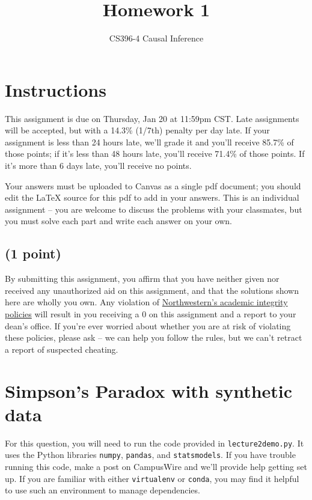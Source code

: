\documentclass[12pt]{article}
\title{Homework 1}
\author{CS396-4 Causal Inference}
\begin{document}
\maketitle

\section*{Instructions}

This assignment is due on Thursday, Jan 20 at 11:59pm CST. Late assignments will be accepted, but with a 14.3\% (1/7th) penalty per day late. If your assignment is less than 24 hours late, we’ll grade it and you’ll receive 85.7\% of those points; if it’s less than 48 hours late, you’ll receive 71.4\% of those points. If it’s more than 6 days late, you’ll receive no points.

Your answers must be uploaded to Canvas as a single pdf document; you should edit the LaTeX source for this pdf to add in your answers. This is an individual assignment -- you are welcome to discuss the problems with your classmates, but you must solve each part and write each answer on your own.

\subsection{(1 point)}

By submitting this assignment, you affirm that you have neither given nor received any unauthorized aid on this assignment, and that the solutions shown here are wholly you own. Any violation of \href{https://www.northwestern.edu/provost/policies/academic-integrity/index.html}{Northwestern's academic integrity policies} will result in you receiving a 0 on this assignment and a report to your dean's office. If you're ever worried about whether you are at risk of violating these policies, please ask -- we can help you follow the rules, but we can't retract a report of suspected cheating.

\clearpage

\section{Simpson's Paradox with synthetic data}

For this question, you will need to run the code provided in {\tt lecture2demo.py}. It uses the Python libraries {\tt numpy}, {\tt pandas}, and {\tt statsmodels}. If you have trouble running this code, make a post on CampusWire and we'll provide help getting set up. If you are familiar with either {\tt virtualenv} or {\tt conda}, you may find it helpful to use such an environment to manage dependencies.
\end{document}
